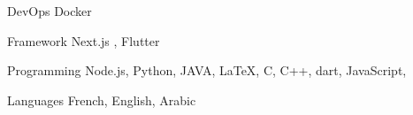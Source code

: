 

\begin{cvskills}

  \cvskill
    {DevOps} %
    {Docker} %

  \cvskill
    {Framework} %
    {Next.js , Flutter} %

  \cvskill
    {Programming} %
    {Node.js, Python, JAVA, LaTeX, C, C++, dart, JavaScript, } %

  \cvskill
    {Languages} %
    {French, English, Arabic} %

\end{cvskills}
